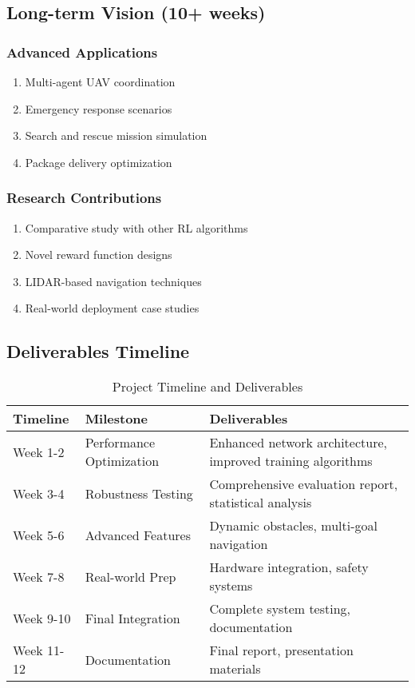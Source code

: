 \documentclass[12pt,a4paper]{article}
\begin{document}
\subsection{Long-term Vision (10+ weeks)}

\subsubsection{Advanced Applications}
\begin{enumerate}
    \item Multi-agent UAV coordination
    \item Emergency response scenarios
    \item Search and rescue mission simulation
    \item Package delivery optimization
\end{enumerate}

\subsubsection{Research Contributions}
\begin{enumerate}
    \item Comparative study with other RL algorithms
    \item Novel reward function designs
    \item LIDAR-based navigation techniques
    \item Real-world deployment case studies
\end{enumerate}

\subsection{Deliverables Timeline}

\begin{table}[H]
\centering
\caption{Project Timeline and Deliverables}
\begin{tabular}{@{}llp{6cm}@{}}
\toprule
Timeline & Milestone & Deliverables \\
\midrule
Week 1-2 & Performance Optimization & Enhanced network architecture, improved training algorithms \\
Week 3-4 & Robustness Testing & Comprehensive evaluation report, statistical analysis \\
Week 5-6 & Advanced Features & Dynamic obstacles, multi-goal navigation \\
Week 7-8 & Real-world Prep & Hardware integration, safety systems \\
Week 9-10 & Final Integration & Complete system testing, documentation \\
Week 11-12 & Documentation & Final report, presentation materials \\
\bottomrule
\end{tabular}
\end{table}
\end{document}

